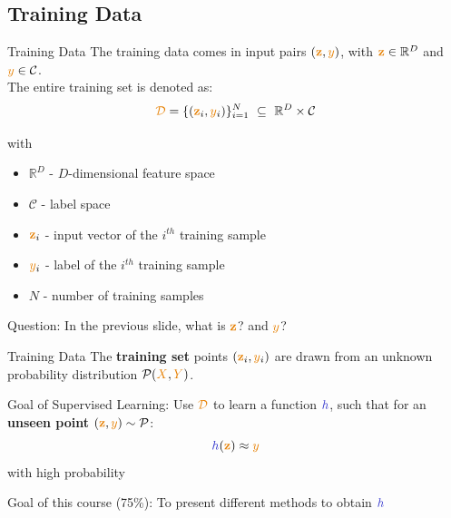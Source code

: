 \documentclass[aspectratio=169,10pt]{beamer}
\begin{document}
\subsection{Training Data}
\begin{frame}{Training Data}
	The training data comes in input pairs $(\boldx, \smally)$, with  $\boldx \in \mathbb{R}^{D}$ and $\smally \in \mathcal{C}$.\\
		\vspace{0.5cm}
	The entire training set is denoted as:
	\begin{equation*}
		\trainset = \lbrace(\boldx_{i},\smally_{i})\rbrace_{i=1}^N \,\, \subseteq \,\, \mathbb{R}^{D} \times \mathcal{C}
	\end{equation*}	

	with
	\begin{itemize}
		\item $\mathbb{R}^{D}$ - $D$-dimensional feature space
		\item $\mathcal{C}$ - label space
		\item $\boldx_{i}$ - input vector of the $i^{th}$ training sample
		\item $\smally_i$ - label of the $i^{th}$ training sample
		\item $N$ - number of training samples
	\end{itemize} 

\vspace{1.0cm}
	\alert{Question:} In the previous slide, what is $\boldx$? and $\smally$? 

\end{frame}

%
%

\begin{frame}{Training Data}
	The \textbf{training set} points $(\boldx_{i},\smally_{i})$ are drawn from an unknown probability distribution $\mathcal{P}(\bigX,\bigy)$.
	\vspace{0.5cm}
	\pause
	\begin{alertblock}{Goal of Supervised Learning:}
		Use $\trainset$ to learn a function $\hypothesis$, such that for an \textbf{unseen point} $(\boldx,\smally) \sim \mathcal{P}$:
		\begin{equation*}
			\hypothesis(\boldx) \approx \smally
		\end{equation*}
		with  high probability
	\end{alertblock}
	\vspace{0.5cm}
	\pause
	\begin{alertblock}{Goal of this course (75\%):}
		To present different methods to obtain $\hypothesis$
	\end{alertblock}	
\end{frame}	
\end{document}
